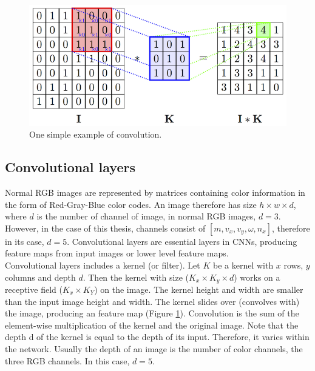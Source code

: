     \begin{figure}[!h]
        \centering
        \includegraphics[scale=1.3]{Figures/convolve.png}
        \caption{One simple example of convolution.}
        \label{con}
    \end{figure}

    \subsection{Convolutional layers}
    Normal RGB images are represented by matrices containing color information in the form of Red-Gray-Blue color codes. An image therefore has size $h\times w \times d$, where $d$ is the number of channel of image, in normal RGB images, $d=3$. However, in the case of this thesis, channels consist of $[m, v_x, v_y, \omega, n_x]$, therefore in its case, $d=5$. Convolutional layers are essential layers in CNNs, producing feature maps from input images or lower level feature maps. \\

    Convolutional layers includes a kernel (or filter). Let $K$ be a kernel with $x$ rows, $y$ columns and depth $d$. Then the kernel with size ($K_x \times K_y \times d$) works on a receptive field ($K_x \times K_Y$) on the image. The kernel height and width are smaller than the input image height and width. The kernel slides over (convolves with) the image, producing an feature map (Figure \ref{con}). Convolution is the sum of the element-wise multiplication of the kernel and the original image. Note that the depth d of the kernel is equal to the depth of its input. Therefore, it varies within the network. Usually the depth of an image is the number of color channels, the three RGB channels. In this case, $d=5$. \\

